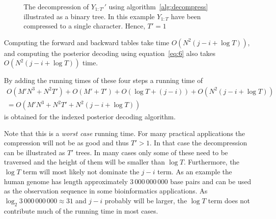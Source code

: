 \begin{enumerate}
  \begin{figure}
    \centering
    
    \caption{The decompression of $Y_{1:T'}'$ using
      algorithm~\ref{alg:decompress} illustrated as a binary tree. In this
      example $Y_{1:T}$ have been compressed to a single character. Hence,
      $T' = 1$}
    \label{fig:decompression}
  \end{figure}

  Computing the forward and backward tables take time
  $O(N^2 (j - i + \log T))$, and computing the posterior decoding using
  equation~\eqref{eq:6} also takes $O(N^2 (j - i + \log T))$ time.
\end{enumerate}
By adding the running times of these four steps a running time of
\begin{gather*}
  O\left(M' N^3 + N^2 T'\right) + O\left(M' + T'\right) + O\left(\log T + (j - i)\right) + O\left(N^2 (j - i + \log T)\right) \\
  = O\left(M' N^3 + N^2 T' + N^2 (j - i + \log T)\right)
\end{gather*}
is obtained for the indexed posterior decoding algorithm.

Note that this is a \emph{worst case} running time. For many practical
applications the compression will not be as good and thus $T' > 1$. In that
case the decompression can be illustrated as $T'$ trees. In many cases only
some of these need to be traversed and the height of them will be
smaller than $\log T$. Furthermore, the $\log T$ term will most likely not
dominate the $j - i$ term. As an example the human genome has length
approximately $3\,000\,000\,000$ base pairs and can be used as the observation sequence
in some bioinformatics applications. As $\log_2 3\,000\,000\,000 \approx 31$ and
$j - i$ probably will be larger, the $\log T$ term does not contribute much
of the running time in most cases.

